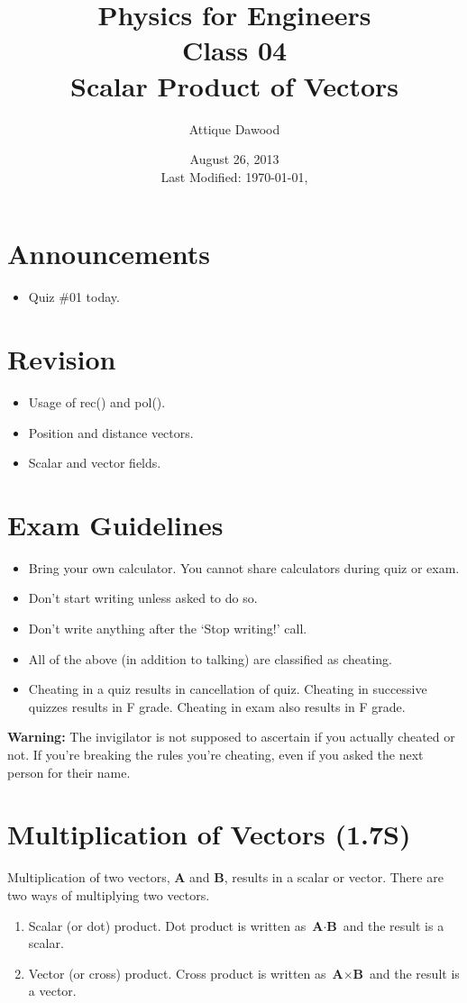 \documentclass[12pt,a4paper]{article}
\title{\vspace{-2cm}Physics for Engineers\\Class 04\\Scalar Product of Vectors}
\author{Attique Dawood}
\date{August 26, 2013\\[0.2cm] Last Modified: \today, \currenttime}
\begin{document}
\maketitle
\section{Announcements}
\begin{itemize}
\item Quiz \#01 today.
\end{itemize}
\section{Revision}
\begin{itemize}
\item Usage of rec() and pol().
\item Position and distance vectors.
\item Scalar and vector fields.
\end{itemize}
\section{Exam Guidelines}
\begin{itemize}
\item Bring your own calculator. You cannot share calculators during quiz or exam.
\item Don't start writing unless asked to do so.
\item Don't write anything after the `Stop writing!' call.
\item All of the above (in addition to talking) are classified as cheating.
\item Cheating in a quiz results in cancellation of quiz. Cheating in successive quizzes results in F grade. Cheating in exam also results in F grade.
\end{itemize}
\textbf{Warning:} The invigilator is not supposed to ascertain if you actually cheated or not. If you're breaking the rules you're cheating, even if you asked the next person for their name.
\section{Multiplication of Vectors (1.7S)}
Multiplication of two vectors, \textbf{A} and \textbf{B}, results in a scalar or vector. There are two ways of multiplying two vectors.
\begin{enumerate}
\item Scalar (or dot) product. Dot product is written as $\textbf{A}\cdot \textbf{B}$ and the result is a scalar.
\item Vector (or cross) product. Cross product is written as $\textbf{A}\times \textbf{B}$ and the result is a vector.
\end{enumerate}
\end{document}
